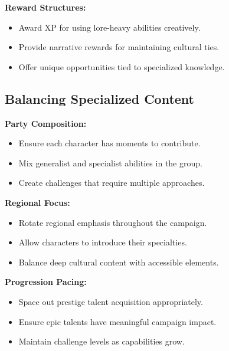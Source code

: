 \textbf{Reward Structures:}
\begin{itemize}
\item Award XP for using lore-heavy abilities creatively.
\item Provide narrative rewards for maintaining cultural ties.
\item Offer unique opportunities tied to specialized knowledge.
\end{itemize}

\subsection{Balancing Specialized Content}
\label{subsec:balancing-content}

\textbf{Party Composition:}
\begin{itemize}
\item Ensure each character has moments to contribute.
\item Mix generalist and specialist abilities in the group.
\item Create challenges that require multiple approaches.
\end{itemize}

\textbf{Regional Focus:}
\begin{itemize}
\item Rotate regional emphasis throughout the campaign.
\item Allow characters to introduce their specialties.
\item Balance deep cultural content with accessible elements.
\end{itemize}

\textbf{Progression Pacing:}
\begin{itemize}
\item Space out prestige talent acquisition appropriately.
\item Ensure epic talents have meaningful campaign impact.
\item Maintain challenge levels as capabilities grow.
\end{itemize}


